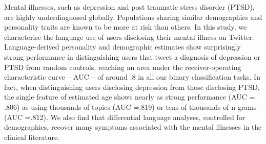 Mental illnesses, such as depression and post traumatic stress disorder (PTSD), are highly underdiagnosed globally. Populations sharing similar demographics and personality traits are known to be more at risk than others. In this study, we characterise the language use of users disclosing their mental illness on Twitter. Language-derived personality and demographic estimates show surprisingly strong performance in distinguishing  users that tweet a diagnosis of depression or PTSD from random controls, reaching an area under the receiver-operating characteristic curve -- AUC -- of around .8 in all our binary classification tasks. In fact, when distinguishing users disclosing depression from those disclosing PTSD, the single feature of estimated age shows nearly as strong performance (AUC = .806) as using thousands of topics (AUC =.819) or tens of thousands of n-grams (AUC =.812). We also find that differential language analyses, controlled for demographics, recover many symptoms associated with the mental illnesses in the clinical literature.
